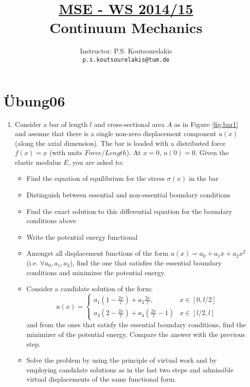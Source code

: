 \documentclass{article}
\title{\underline{MSE - WS 2014/15}\\
Continuum Mechanics}
\author{
Instructor: P.S. Koutsourelakis  \\
\texttt{p.s.koutsourelakis@tum.de} \\
}
\newcommand{\ee}{\end{equation}}
\newcommand{\be}{\begin{equation}}
\newcommand{\bi}{\begin{itemize}}
\newcommand{\ei}{\end{itemize}}
\begin{document}
\makeanontitle

%

\section*{\"Ubung06}


\begin{enumerate}

\item Consider a  bar of length $l$ and cross-sectional area $A$ as in Figure \ref{fig:bar1} and assume that there is a single non-zero displacement component $u(x)$ (along the axial dimension).
The bar is loaded with a distributed force $f(x)=x$ (with units $Force/Length$).  At $x=0$, $u(0)=0$.
Given the elastic modulus $E$, you are asked to:
\bi
\item Find the equation of equilibrium for the stress $\sigma(x)$ in the bar
\item Distinguish between essential and non-essential boundary conditions
\item Find the exact solution to this differential equation for the boundary conditions above
\item Write the potential energy functional
\item Amongst all displacement functions of the form $u(x)=a_0+a_1x+a_2x^2$ (i.e. $\forall a_0,a_1,a_2$), find the one that satisfies the essential boundary conditions and minimizes the potential energy.
\item Consider a candidate solution of the form:
\be
u(x)=\left\{ \begin{array}{ll} a_1(1-\frac{2x}{l})+a_2 \frac{2x}{l}, & x\in [0,l/2] \\
                               a_3(2-\frac{2x}{l})+a_4 (\frac{2x}{l}-1)& x\in [l/2,l] 
             \end{array} \right.
\ee
and from the ones that satisfy the essential boundary conditions, find the minimizer of the potential energy. Compare the answer with the previous step.
\item Solve the problem by using the principle of virtual work and by employing candidate solutions as in the last two steps and admissible virtual displacements of the same functional form. 
\ei
\begin{figure}[th]
\hfill
{}
\end{figure}


\end{enumerate}
\end{document}
